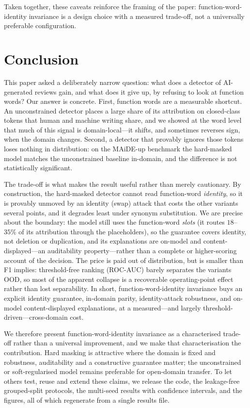 \documentclass[10pt,twocolumn]{article}
\begin{document}
Taken together, these caveats reinforce the framing of the paper: function-word-identity invariance is a design choice with a measured trade-off, not a universally preferable configuration.

\section{Conclusion}
This paper asked a deliberately narrow question: what does a detector of AI-generated reviews gain, and what does it give up, by refusing to look at function words? Our answer is concrete. First, function words are a measurable shortcut. An unconstrained detector places a large share of its attribution on closed-class tokens that human and machine writing share, and we showed at the word level that much of this signal is domain-local---it shifts, and sometimes reverses sign, when the domain changes. Second, a detector that provably ignores those tokens loses nothing in distribution: on the MAiDE-up benchmark the hard-masked model matches the unconstrained baseline in-domain, and the difference is not statistically significant.

The trade-off is what makes the result useful rather than merely cautionary. By construction, the hard-masked detector cannot read function-word \emph{identity}, so it is provably unmoved by an identity (swap) attack that costs the other variants several points, and it degrades least under synonym substitution. We are precise about the boundary: the model still uses the function-word \emph{slots} (it routes $18$--$35\%$ of its attribution through the placeholders), so the guarantee covers identity, not deletion or duplication, and its explanations are on-model and content-displayed---an auditability property---rather than a complete or higher-scoring account of the decision. The price is paid out of distribution, but is smaller than F1 implies: threshold-free ranking (ROC-AUC) barely separates the variants OOD, so most of the apparent collapse is a recoverable operating-point effect rather than lost separability. In short, function-word-identity invariance buys an explicit identity guarantee, in-domain parity, identity-attack robustness, and on-model content-displayed explanations, at a measured---and largely threshold-driven---cross-domain cost.

We therefore present function-word-identity invariance as a characterised trade-off rather than a universal improvement, and we make that characterisation the contribution. Hard masking is attractive where the domain is fixed and robustness, auditability and a constructive guarantee matter; the unconstrained or soft-regularised model remains preferable for open-domain transfer. To let others test, reuse and extend these claims, we release the code, the leakage-free grouped-split protocols, the multi-seed results with confidence intervals, and the figures, all of which regenerate from a single results file.
\end{document}
